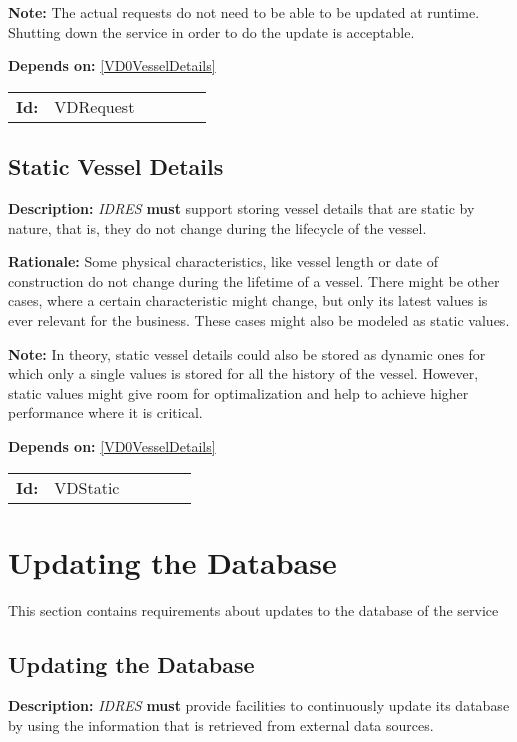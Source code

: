 \textbf{Note:} The actual requests do not need to be able to be updated at runtime. Shutting down the service in order to do the update is acceptable.

\textbf{Depends on:} \ref{VD0VesselDetails} 

\par
{\small \begin{center}\begin{tabular}{rlrlrl}
\textbf{Id:} & VDRequest  & & & \end{tabular}\end{center} }

\subsection{Static Vessel Details}\label{VDStatic}
\textbf{Description:} \textsl{IDRES} \textbf{must} support storing vessel details that are static by nature, that is, they do not change during the  lifecycle of the vessel.

\textbf{Rationale:} Some physical characteristics, like vessel length or date of  construction do not change during the lifetime of a vessel.  There might be other  cases, where a certain characteristic might change, but only its latest  values is ever relevant for the business. These cases might also  be modeled as static values. 

\textbf{Note:} In theory, static vessel details could also be stored as dynamic ones  for which only a single values is stored for all the history of the vessel. However, static values might give room for optimalization and help to achieve higher performance where it is critical.

\textbf{Depends on:} \ref{VD0VesselDetails} 

\par
{\small \begin{center}\begin{tabular}{rlrlrl}
\textbf{Id:} & VDStatic  & & & \end{tabular}\end{center} }

\section{Updating the Database}
This section contains requirements about updates to the database of  the service 
\subsection{Updating the Database}\label{Upd0Update}
\textbf{Description:} \textsl{IDRES} \textbf{must} provide facilities to continuously  update its database by using the information that is retrieved from external data sources.

